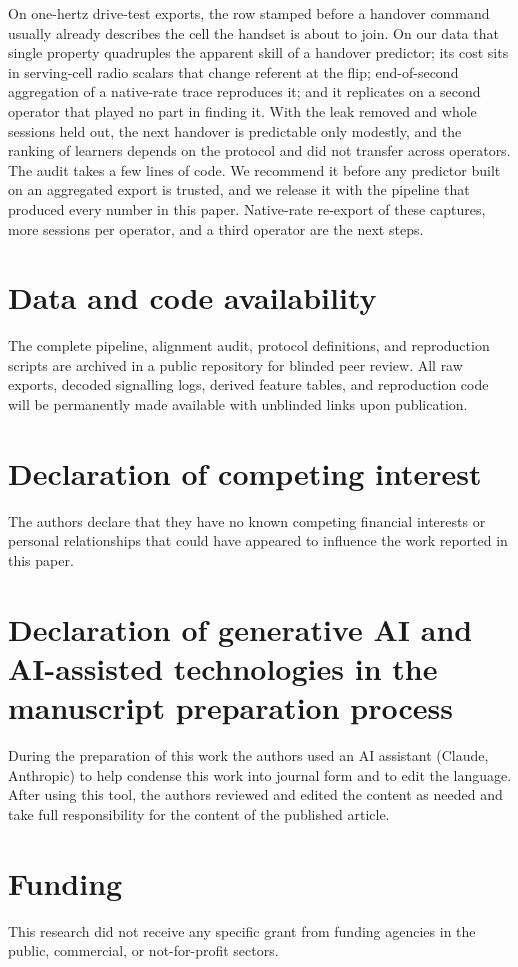 \documentclass[preprint,review,12pt]{elsarticle}\usepackage{lineno}\linenumbers
\begin{document}
On one-hertz drive-test exports, the row stamped before a handover command usually already describes the cell the handset is about to join. On our data that single property quadruples the apparent skill of a handover predictor; its cost sits in serving-cell radio scalars that change referent at the flip; end-of-second aggregation of a native-rate trace reproduces it; and it replicates on a second operator that played no part in finding it. With the leak removed and whole sessions held out, the next handover is predictable only modestly, and the ranking of learners depends on the protocol and did not transfer across operators. The audit takes a few lines of code. We recommend it before any predictor built on an aggregated export is trusted, and we release it with the pipeline that produced every number in this paper. Native-rate re-export of these captures, more sessions per operator, and a third operator are the next steps.

\section*{Data and code availability}
The complete pipeline, alignment audit, protocol definitions, and reproduction scripts are archived in a public repository for blinded peer review. All raw exports, decoded signalling logs, derived feature tables, and reproduction code will be permanently made available with unblinded links upon publication.


\section*{Declaration of competing interest}
The authors declare that they have no known competing financial interests or personal relationships that could have appeared to influence the work reported in this paper.

\section*{Declaration of generative AI and AI-assisted technologies in the manuscript preparation process}
During the preparation of this work the authors used an AI assistant (Claude, Anthropic) to help condense this work into journal form and to edit the language. After using this tool, the authors reviewed and edited the content as needed and take full responsibility for the content of the published article.

\section*{Funding}
This research did not receive any specific grant from funding agencies in the public, commercial, or not-for-profit sectors.



\end{document}
